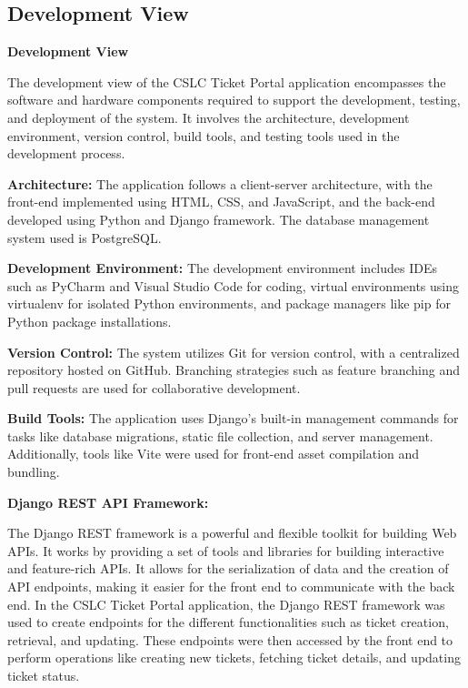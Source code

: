 \documentclass[oneside,openany,obeyspaces]{book}
\begin{document}
\begin{flushleft}
    \section{Development View}
    \textbf{Development View}

    The development view of the CSLC Ticket Portal application encompasses the software and hardware components required to support the development, testing, and deployment of the system. It involves the architecture, development environment, version control, build tools, and testing tools used in the development process.

    \textbf{Architecture:}
    The application follows a client-server architecture, with the front-end implemented using HTML, CSS, and JavaScript, and the back-end developed using Python and Django framework. The database management system used is PostgreSQL.

    \textbf{Development Environment:}
    The development environment includes IDEs such as PyCharm and Visual Studio Code for coding, virtual environments using virtualenv for isolated Python environments, and package managers like pip for Python package installations.

    \textbf{Version Control:}
    The system utilizes Git for version control, with a centralized repository hosted on GitHub. Branching strategies such as feature branching and pull requests are used for collaborative development.

    \textbf{Build Tools:}
    The application uses Django's built-in management commands for tasks like database migrations, static file collection, and server management. Additionally, tools like Vite were used for front-end asset compilation and bundling.

    \textbf{Django REST API Framework:}

    The Django REST framework is a powerful and flexible toolkit for building Web APIs. It works by providing a set of tools and libraries for building interactive and feature-rich APIs. It allows for the serialization of data and the creation of API endpoints, making it easier for the front end to communicate with the back end.
    In the CSLC Ticket Portal application, the Django REST framework was used to create endpoints for the different functionalities such as ticket creation, retrieval, and updating. These endpoints were then accessed by the front end to perform operations like creating new tickets, fetching ticket details, and updating ticket status.


\end{flushleft}
\end{document}
